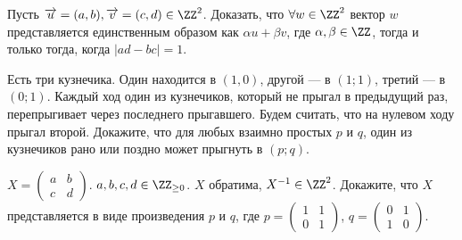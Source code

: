 \documentclass[12pt,a4paper]{article}
\begin{document}
    \begin{problem}
        Пусть $\overrightarrow{u} = (a, b), \overrightarrow{v} = (c, d) \in \ZZ^2$. Доказать, что $\forall w \in \ZZ^2$ вектор $w$ представляется единственным образом как $\alpha u + \beta v$, где $\alpha, \beta \in \ZZ$, тогда и только тогда, когда $|ad-bc| = 1$.
    \end{problem}

    \begin{problem}
        Есть три кузнечика. Один находится в $(1, 0)$, другой --- в $(1;1)$, третий --- в $(0;1)$. Каждый ход один из кузнечиков, который не прыгал в предыдущий раз, перепрыгивает через последнего прыгавшего. Будем считать, что на нулевом ходу прыгал второй. Докажите, что для любых взаимно простых $p$ и $q$, один из кузнечиков рано или поздно может прыгнуть в $(p;q)$.
    \end{problem}

    \begin{problem}
        $X =
        \left(\begin{smallmatrix}
            a & b\\ c & d
        \end{smallmatrix}\right)$. $a, b, c, d \in \ZZ_{\geq 0}$. $X$ обратима, $X^{-1} \in \ZZ^2$. Докажите, что $X$ представляется в виде произведения $p$ и $q$, где $p = 
        \left(\begin{smallmatrix}
            1 & 1\\ 0 & 1
        \end{smallmatrix}\right)$, $q = 
        \left(\begin{smallmatrix}
            0 & 1\\ 1 & 0
        \end{smallmatrix}\right)$.
    \end{problem}
\end{document}
